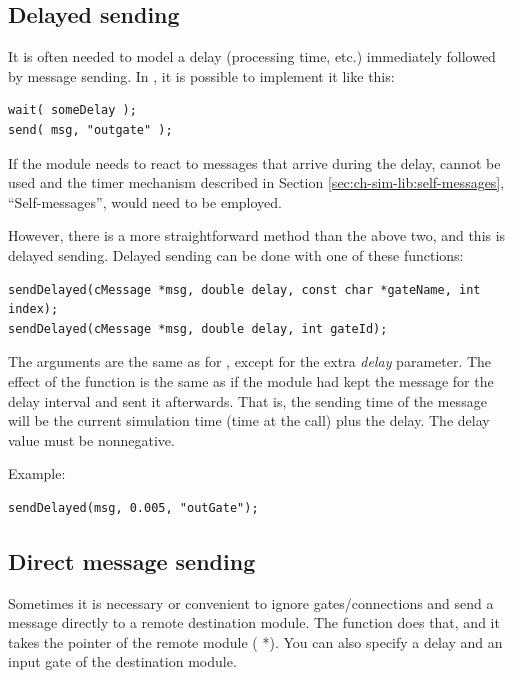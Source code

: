 \subsection{Delayed sending}

It is often needed to model a delay (processing time, etc.) immediately
followed by message sending. In {\opp}, it is possible to implement
it like this:

\begin{verbatim}
wait( someDelay );
send( msg, "outgate" );
\end{verbatim}


If the module needs to react to messages that arrive during the delay,
 cannot be used and the timer mechanism described in
Section \ref{sec:ch-sim-lib:self-messages}, ``Self-messages'', would
need to be employed.


However, there is a more straightforward method than the above two,
and this is delayed sending. Delayed sending
can be done with one of these functions:

\begin{verbatim}
sendDelayed(cMessage *msg, double delay, const char *gateName, int index);
sendDelayed(cMessage *msg, double delay, int gateId);
\end{verbatim}


The arguments are the same as for , except for the extra \textit{delay}
parameter. The effect of the function is the same as if the module
had kept the message for the delay interval and sent it afterwards.
That is, the sending time of the message will be the current
simulation time (time at the  call) plus the delay.
The delay value must be nonnegative.

Example:

\begin{verbatim}
sendDelayed(msg, 0.005, "outGate");
\end{verbatim}



\subsection{Direct message sending}

Sometimes it is necessary or convenient to ignore gates/connections
and send a message directly to a remote destination module. The 
function does that, and it takes the pointer of the remote module
( *). You can also specify a delay and an input gate of
the destination module.


